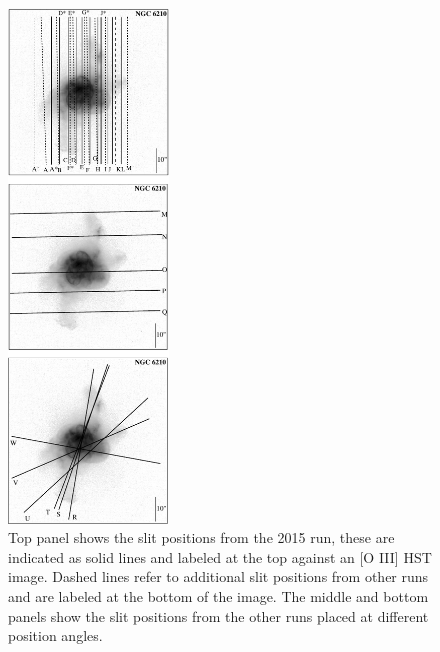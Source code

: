 \documentclass[useAMS, usenatbib]{mnras}
\begin{document}
 \begin{figure}
   \centering
   \includegraphics[width=0.38\textwidth]{tere-figs/Figure2a}
  \caption{Top panel shows the slit positions from the 2015 run, these are indicated as solid lines and 
labeled at the top against an [O III] HST image. Dashed lines refer to additional slit positions from other runs
and are labeled at the bottom of the image. The middle and bottom panels show the slit positions from 
the other runs placed at different position angles. }
  \label{fig:slit-positions}
\end{figure}
\end{document}
